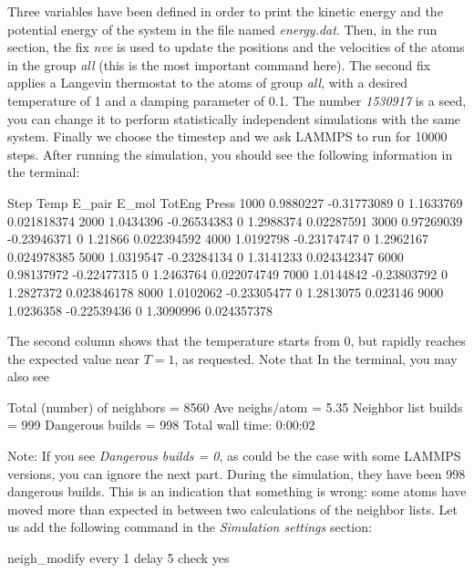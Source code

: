 Three variables have been defined in order
to print the kinetic energy and the potential energy 
of the system in the file named \textit{energy.dat}. Then,
in the run section, the fix \textit{nve} is used to update the
positions and the velocities of the atoms in the group
\textit{all} (this is the most important command here). The second
fix applies a Langevin thermostat to the atoms of group
\textit{all}, with a desired temperature of 1 and a damping
parameter of 0.1. The number \textit{1530917} is a seed, you can
change it to perform statistically independent simulations
with the same system. Finally we choose the timestep
and we ask LAMMPS to run for 10000 steps. After running
the simulation, you should see the following information in
the terminal:

\begin{lcverbatim}
Step         Temp       E_pair    E_mol       TotEng        Press
1000    0.9880227  -0.31773089        0    1.1633769  0.021818374 
2000    1.0434396  -0.26534383        0    1.2988374   0.02287591 
3000   0.97269039  -0.23946371        0      1.21866  0.022394592 
4000    1.0192798  -0.23174747        0    1.2962167  0.024978385 
5000    1.0319547  -0.23284134        0    1.3141233  0.024342347 
6000   0.98137972  -0.22477315        0    1.2463764  0.022074749 
7000    1.0144842  -0.23803792        0    1.2827372  0.023846178 
8000    1.0102062  -0.23305477        0    1.2813075     0.023146 
9000    1.0236358  -0.22539436        0    1.3090996  0.024357378 
\end{lcverbatim}

\noindent The second column shows that the temperature
starts from 0, but rapidly reaches the
expected value near $T=1$, as requested. 
Note that  In the terminal, you may also see

\begin{lcverbatim}
Total (number) of neighbors = 8560
Ave neighs/atom = 5.35
Neighbor list builds = 999
Dangerous builds = 998
Total wall time: 0:00:02
\end{lcverbatim}

\noindent Note: If you see \textit{Dangerous builds = 0}, as could be
the case with some LAMMPS versions, you can ignore
the next part.
During the simulation, they have been 998 dangerous builds.
This is an indication that something is wrong: some atoms
have moved more than expected in between two calculations of
the neighbor lists. Let us add the following command in the
\textit{Simulation settings} section:

\begin{lcverbatim}
neigh_modify every 1 delay 5 check yes
\end{lcverbatim}

